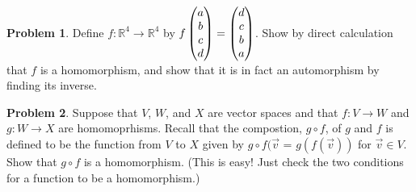 \documentclass[11pt]{article}
\newcommand{\R}{{\mathbb R}}
\theoremstyle{definition}
\newtheorem{problem}{Problem}
\newenvironment{answer}{\par\bigskip\bgroup\color{darkblue}}{\egroup}
\begin{document}
\begin{answer}
\end{answer}




\begin{problem}
Define $f\colon \R^4\to\R^4$ by $f\begin{pmatrix}a\\b\\c\\d\end{pmatrix}=\begin{pmatrix}d\\c\\b\\a\end{pmatrix}$.
Show by direct calculation that $f$ is a homomorphism, and show that it is in fact
an automorphism by finding its inverse.
\end{problem}

\begin{answer}
\end{answer}



\begin{problem}
Suppose that $V$, $W$, and $X$ are vector spaces and that $f\colon V\to W$ and $g\colon W\to X$
are homomoprhisms.  Recall that the compostion, $g\circ f$, of $g$ and $f$ is defined to
be the function from $V$ to $X$ given  by $g\circ f(\vec v$ = $g(f(\vec v))$ for $\vec v\in V$.
Show that $g\circ f$ is a homomorphism.  (This is easy!  Just check the two conditions for a
function to be a homomorphism.)
\end{problem}

\begin{answer}
\end{answer}
\end{document}
